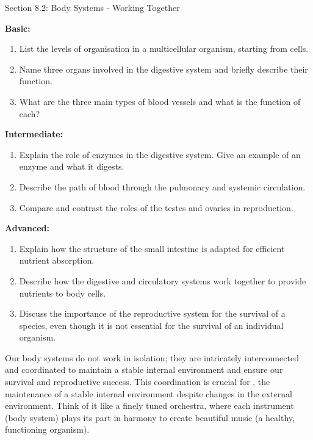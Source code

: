 \begin{tieredquestions}{Section 8.2: Body Systems - Working Together}

\textbf{Basic:}
\begin{enumerate}
    \item List the levels of organisation in a multicellular organism, starting from cells.
    \item Name three organs involved in the digestive system and briefly describe their function.
    \item What are the three main types of blood vessels and what is the function of each?
\end{enumerate}

\textbf{Intermediate:}
\begin{enumerate}
    \item Explain the role of enzymes in the digestive system. Give an example of an enzyme and what it digests.
    \item Describe the path of blood through the pulmonary and systemic circulation.
    \item Compare and contrast the roles of the testes and ovaries in reproduction.
\end{enumerate}

\textbf{Advanced:}
\begin{enumerate}
    \item  Explain how the structure of the small intestine is adapted for efficient nutrient absorption.
    \item  Describe how the digestive and circulatory systems work together to provide nutrients to body cells.
    \item  Discuss the importance of the reproductive system for the survival of a species, even though it is not essential for the survival of an individual organism.
\end{enumerate}
\end{tieredquestions}


\FloatBarrier
\1

Our body systems do not work in isolation; they are intricately interconnected and coordinated to maintain a stable internal environment and ensure our survival and reproductive success. This coordination is crucial for , the maintenance of a stable internal environment despite changes in the external environment.  Think of it like a finely tuned orchestra, where each instrument (body system) plays its part in harmony to create beautiful music (a healthy, functioning organism).

